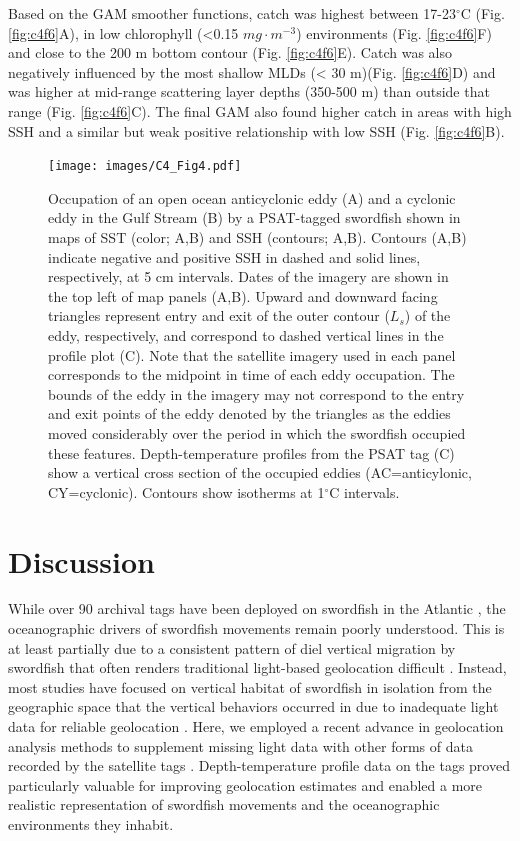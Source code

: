 Based on the GAM smoother functions, catch was highest between 17-23$^{\circ}$C (Fig. \ref{fig:c4f6}A), in low chlorophyll (<0.15 \(mg \cdot m^{-3}\)) environments (Fig. \ref{fig:c4f6}F) and close to the 200 m bottom contour (Fig. \ref{fig:c4f6}E). Catch was also negatively influenced by the most shallow MLDs (< 30 m)(Fig. \ref{fig:c4f6}D) and was higher at mid-range scattering layer depths (350-500 m) than outside that range (Fig. \ref{fig:c4f6}C). The final GAM also found higher catch in areas with high SSH and a similar but weak positive relationship with low SSH (Fig. \ref{fig:c4f6}B).

\begin{figure}[htbp]
\centering
\texttt{[image: images/C4\_Fig4.pdf]}
\caption[Example use of eddies by an archival-tagged swordfish]{Occupation of an open ocean anticyclonic eddy (A) and a cyclonic eddy in the Gulf Stream (B) by a PSAT-tagged swordfish shown in maps of SST (color; A,B) and SSH (contours; A,B). Contours (A,B) indicate negative and positive SSH in dashed and solid lines, respectively, at 5 cm intervals. Dates of the imagery are shown in the top left of map panels (A,B). Upward and downward facing triangles represent entry and exit of the outer contour ($L_s$) of the eddy, respectively, and correspond to dashed vertical lines in the profile plot (C). Note that the satellite imagery used in each panel corresponds to the midpoint in time of each eddy occupation. The bounds of the eddy in the imagery may not correspond to the entry and exit points of the eddy denoted by the triangles as the eddies moved considerably over the period in which the swordfish occupied these features. Depth-temperature profiles from the PSAT tag (C) show a vertical cross section of the occupied eddies (AC=anticylonic, CY=cyclonic). Contours show isotherms at 1$^{\circ}$C intervals.}
\label{fig:c4f4}
\end{figure}

\section{Discussion}

While over 90 archival tags have been deployed on swordfish in the Atlantic \citep{Braun2015}, the oceanographic drivers of swordfish movements remain poorly understood. This is at least partially due to a consistent pattern of diel vertical migration by swordfish that often renders traditional light-based geolocation difficult \citep{Dewar2011, Lerner2013}. Instead, most studies have focused on vertical habitat of swordfish in isolation from the geographic space that the vertical behaviors occurred in due to inadequate light data for reliable geolocation \citep{Abecassis2012, Dewar2011, Evans2014, Loefer2007, Lerner2013}. Here, we employed a recent advance in geolocation analysis methods to supplement missing light data with other forms of data recorded by the satellite tags \citep[][Chapters \ref{chap:2}, \ref{chap:3}]{Braun2018a, Braun2018b}. Depth-temperature profile data on the tags proved particularly valuable for improving geolocation estimates and enabled a more realistic representation of swordfish movements and the oceanographic environments they inhabit.

